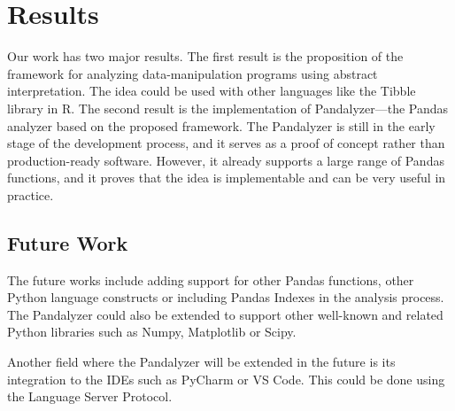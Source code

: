 \section{Results}

Our work has two major results.
The first result is the proposition of the framework for analyzing data-manipulation programs using abstract
interpretation.
The idea could be used with other languages like the Tibble~\cite{tibble} library in R\@.
The second result is the implementation of Pandalyzer---the Pandas analyzer based on the proposed framework.
The Pandalyzer is still in the early stage of the development process, and it serves as a proof of concept rather
than production-ready software.
However, it already supports a large range of Pandas functions, and it proves that the idea is implementable and can be
very useful in practice.

\subsection{Future Work}

The future works include adding support for other Pandas functions, other Python language constructs or including
Pandas Indexes in the analysis process.
The Pandalyzer could also be extended to support other well-known and related Python libraries such as Numpy,
Matplotlib or Scipy.

Another field where the Pandalyzer will be extended in the future is its integration to the IDEs such as PyCharm or
VS Code.
This could be done using the Language Server Protocol.
